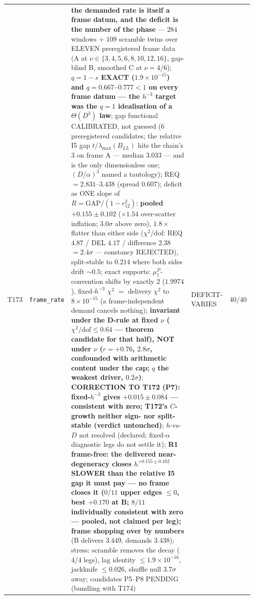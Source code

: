 \documentclass[11pt,a4paper]{article}
\begin{document}
{\begin{xltabular}{\linewidth}{@{}p{0.95cm} >{\raggedright\arraybackslash}p{3.1cm} Y >{\raggedright\scriptsize\arraybackslash}p{3.35cm} p{1.15cm}@{}}
T173 & \texttt{\scriptsize frame\_\allowbreak rate} & \textbf{the demanded rate is itself a frame datum, and the deficit is the number of the phase} --- $284$ windows $+$ $109$ scramble twins over ELEVEN preregistered frame data (A at $\nu\in\{3,4,5,6,8,10,12,16\}$, gap-blind B, smoothed C at $\nu=4/6$); \textbf{$q=1-s$ EXACT ($1.9\times10^{-15}$) and $q=0.667$--$0.777<1$ on every frame datum --- the $h^{-3}$ target was the $q=1$ idealisation of a $\Theta(D^{3})$ law}; gap functional CALIBRATED, not guessed ($6$ preregistered candidates; the relative I5 gap $t/\lambda_{\max}(B_{LL})$ hits the chain's $3$ on frame A --- median $3.033$ --- and is the only dimensionless one; $(D/\alpha)^{3}$ named a tautology); REQ $=2.831$--$3.438$ (spread $0.607$); deficit as ONE slope of $R=\mathrm{GAP}/(1-r_{12}^2)$: \textbf{pooled $+0.155\pm0.102$} ($\times1.54$ over-scatter inflation; $3.0\sigma$ above zero), $1.8\times$ flatter than either side ($\chi^2/\mathrm{dof}$: REQ $4.87$ / DEL $4.17$ / difference $2.38$ $=2.4\sigma$ --- constancy REJECTED), split-stable to $0.214$ where both sides drift ${\sim}0.5$; exact supports: $\mu^P_1$-convention shifts by exactly $2$ ($1.9974$), fixed-$h^{-3}$ $\chi^2$ $=$ delivery $\chi^2$ to $8\times10^{-15}$ (a frame-independent demand cancels nothing); \textbf{invariant under the D-rule at fixed $\nu$ ($\chi^2/\mathrm{dof}\le0.64$ --- theorem candidate for that half), NOT under $\nu$ ($r=+0.76$, $2.8\sigma$, confounded with arithmetic content under the cap; $q$ the weakest driver, $0.2\sigma$)}; \textbf{CORRECTION TO T172 (P7): fixed-$h^{-3}$ gives $+0.015\pm0.084$ --- consistent with zero; T172's $C$-growth neither sign- nor split-stable (verdict untouched)}; $h$-vs-$D$ not resolved (declared; fixed-$\alpha$ diagnostic legs do not settle it); \textbf{R1 frame-free: the delivered near-degeneracy closes $h^{+0.155\pm0.102}$ SLOWER than the relative I5 gap it must pay --- no frame closes it ($0/11$ upper edges $\le0$, best $+0.170$ at B; $8/11$ individually consistent with zero --- pooled, not claimed per leg); frame shopping over by numbers} (B delivers $3.449$, demands $3.438$); stress: scramble removes the decay ($4/4$ legs), lag identity $\le1.9\times10^{-16}$, jackknife $\le0.026$, shuffle null $3.7\sigma$ away; candidates P5--P8 PENDING (bundling with T174) & DEFICIT-VARIES & 40/40\\

\end{xltabular}}
\end{document}
